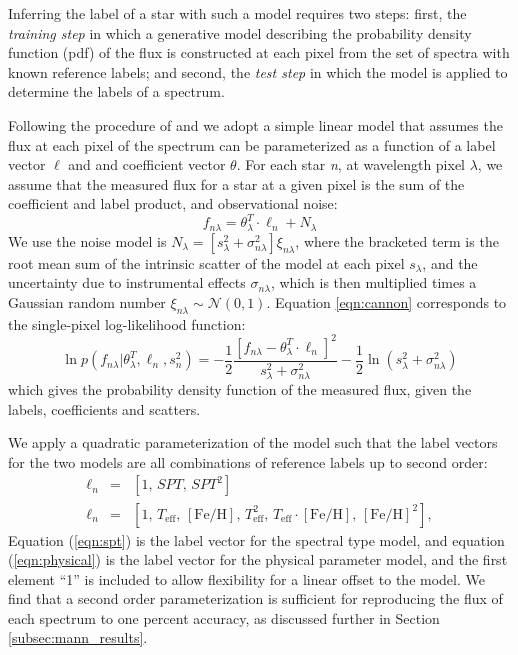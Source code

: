 \documentclass[twocolumn]{aastex62}
\newcommand{\teff}{T_{\mathrm{eff}}}
\newcommand{\feh}{[{\mathrm{Fe}/\mathrm{H}}]}
\begin{document}
Inferring the label of a star with such a model requires two steps: first, the \emph{training step} in which a generative model describing the probability density function (pdf) of the flux is constructed at each pixel from the set of spectra with known reference labels; and second, the \emph{test step} in which the model is applied to determine the labels of a spectrum.

Following the procedure of \citet{Ness:2015} and \citet{Ho:2017a} we adopt a simple linear model that assumes the flux at each pixel of the spectrum can be parameterized as a function of a label vector $\ell$ and and coefficient vector \emph{$\theta$}. For each star \emph{n}, at wavelength pixel \emph{$\lambda$}, we assume that the measured flux for a star at a given pixel is the sum of the coefficient and label product, and observational noise:
\begin{equation}
	f_{n\lambda} = \theta_{\lambda}^{T} \cdot \ell_{n} + N_{\lambda} \label{eqn:cannon}
\end{equation} 
We use the noise model is $N_{\lambda}=[s_{\lambda}^2 + \sigma_{n\lambda}^2]\xi_{n\lambda}$, where the bracketed term is the root mean sum of the intrinsic scatter of the model at each pixel \emph{$s_{\lambda}$}, and the uncertainty due to instrumental effects \emph{$\sigma_{n\lambda}$}, which is then multiplied times a Gaussian random number $\xi_{n\lambda} \sim \mathcal{N} (0,1)$. Equation \ref{eqn:cannon} corresponds to the single-pixel log-likelihood function:
\begin{equation}
	\ln p(f_{n\lambda}|\theta^T_{\lambda}, \ell_n, s^2_n) = 
	-\frac{1}{2}\frac{[f_{n\lambda} - \theta_{\lambda}^{T} \cdot \ell_{n}]^2}{s_{\lambda}^2 + \sigma_{n\lambda}^2} - \frac{1}{2} \ln(s_{\lambda}^2 + \sigma_{n\lambda}^2) 
	\label{eqn:likelihood}
\end{equation}
which gives the probability density function of the measured flux, given the labels, coefficients and scatters.

We apply a quadratic parameterization of the model such that the label vectors for the two models are all combinations of reference labels up to second order:
\begin{eqnarray}
\ell_{n} &=& [1, \, SPT, \, SPT^{2}] \label{eqn:spt}
\\
\ell_{n} &=& [1, \, \teff, \, \feh, \, \teff^2, \, \teff \cdot \feh, \, \feh^{2}] \label{eqn:physical}
,
\end{eqnarray}
Equation (\ref{eqn:spt}) is the label vector for the spectral type model, and equation (\ref{eqn:physical}) is the label vector for the physical parameter model, and the first element ``1'' is included to allow flexibility for a linear offset to the model. We find that a second order parameterization is sufficient for reproducing the flux of each spectrum to one percent accuracy, as discussed further in Section \ref{subsec:mann_results}.
\end{document}

